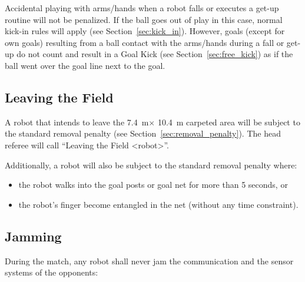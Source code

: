\documentclass[12pt]{article}
\newcommand{\cf}{see\xspace}
\newcommand{\TotalWidth}{7.4~m\xspace}
\newcommand{\TotalLength}{10.4~m\xspace }
\begin{document}
Accidental playing with arms/hands when a robot falls or executes a get-up routine will not be penalized. If the ball goes out of play in this case, normal kick-in rules will apply (\cf Section~\ref{sec:kick_in}). However, goals (except for own goals) resulting from a ball contact with the arms/hands during a fall or get-up do not count and result in a Goal Kick (\cf Section~\ref{sec:free_kick}) as if the ball went over the goal line next to the goal.

\subsection{Leaving the Field}
\label{sec:leaving_field}

A robot that intends to leave the \TotalWidth $\times$ \TotalLength carpeted area will be subject to the standard removal penalty (\cf Section~\ref{sec:removal_penalty}).
The head referee will call ``Leaving the Field \textless robot\textgreater''.

Additionally, a robot will also be subject to the standard removal penalty where:
\begin{itemize}
\item the robot walks into the goal posts or goal net for more than 5 seconds, or
\item the robot's finger become entangled in the net (without any time constraint).
\end{itemize}


\subsection{Jamming}
\label{sec:jamming}
During the match, any robot shall never jam the communication and the sensor systems of the opponents:
\end{document}
